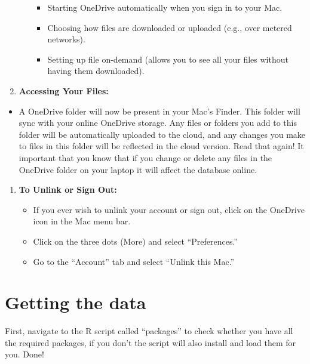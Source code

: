 \documentclass[
]{book}
\providecommand{\tightlist}{%
  \setlength{\itemsep}{0pt}\setlength{\parskip}{0pt}}
\theoremstyle{definition}
\theoremstyle{definition}
\theoremstyle{definition}
\theoremstyle{definition}
\theoremstyle{remark}
\begin{document}
\begin{enumerate}
\begin{itemize}
    \begin{itemize}
    \tightlist
    \item
      Starting OneDrive automatically when you sign in to your Mac.
    \item
      Choosing how files are downloaded or uploaded (e.g., over metered networks).
    \item
      Setting up file on-demand (allows you to see all your files without having them downloaded).
    \end{itemize}
  \end{itemize}
\item
  \textbf{Accessing Your Files:}
\end{enumerate}

\begin{itemize}
\tightlist
\item
  A OneDrive folder will now be present in your Mac's Finder. This folder will sync with your online OneDrive storage. { Any files or folders you add to this folder will be automatically uploaded to the cloud, and any changes you make to files in this folder will be reflected in the cloud version.} Read that again! It important that you know that if you change or delete any files in the OneDrive folder on your laptop it will affect the database online.
\end{itemize}

\begin{enumerate}
\def\labelenumi{\arabic{enumi}.}
\setcounter{enumi}{6}
\tightlist
\item
  \textbf{To Unlink or Sign Out:}

  \begin{itemize}
  \tightlist
  \item
    If you ever wish to unlink your account or sign out, click on the OneDrive icon in the Mac menu bar.
  \item
    Click on the three dots (More) and select ``Preferences.''
  \item
    Go to the ``Account'' tab and select ``Unlink this Mac.''
  \end{itemize}
\end{enumerate}

\hypertarget{getting-the-data}{%
\section{Getting the data}\label{getting-the-data}}

First, navigate to the R script called ``packages'' to check whether you have all the required packages, if you don't the script will also install and load them for you. Done!
\end{document}

